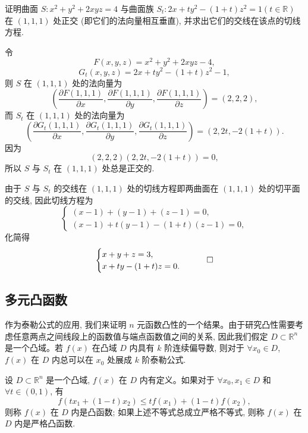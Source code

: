 \begin{example}\label{example:ma-14-6-2}
证明曲面 $S:x^2+y^2+2xyz=4$ 与曲面族 $S_t:2x+ty^2-(1+t)z^2=1(t\in\mathbb R)$ 在 $(1,1,1)$ 处正交 (即它们的法向量相互垂直), 并求出它们的交线在该点的切线方程.
\end{example}


\begin{solve}
令
\[
  F(x,y,z)=x^2+y^2+2xyz-4,
\]
\[
  G_t(x,y,z)=2x+ty^2-(1+t)z^2-1,
\]
则 $S$ 在 $(1,1,1)$ 处的法向量为
\[
  \left(
    \frac{\partial F(1,1,1)}{\partial x},
    \frac{\partial F(1,1,1)}{\partial y},
    \frac{\partial F(1,1,1)}{\partial z}
  \right)
  =(2,2,2),
\]
而 $S_t$ 在 $(1,1,1)$ 处的法向量为
\[
  \left(
    \frac{\partial G_t(1,1,1)}{\partial x},
    \frac{\partial G_t(1,1,1)}{\partial y},
    \frac{\partial G_t(1,1,1)}{\partial z}
  \right)
  =(2,2t,-2(1+t)).
\]
因为
\[
  (2,2,2)(2,2t,-2(1+t))=0,
\]
所以 $S$ 与 $S_t$ 在 $(1,1,1)$ 处总是正交的.

由于 $S$ 与 $S_t$ 的交线在 $(1,1,1)$ 处的切线方程即两曲面在 $(1,1,1)$ 处的切平面的交线, 因此切线方程为
\[
  \begin{cases}
    (x-1)+(y-1)+(z-1)=0,\\
    (x-1)+t(y-1)-(1+t)(z-1)=0,
  \end{cases}
\]
化简得
\[
  \begin{cases}
    x+y+z=3,\\
    x+ty-(1+t)z=0.
  \end{cases}
\qedhere
\]
\end{solve}


\subsection{多元凸函数}
\label{subsec:ma-14-6-3}

作为泰勒公式的应用, 我们来证明 $n$ 元函数凸性的一个结果。由于研究凸性需要考虑任意两点之间线段上的函数值与端点函数值之间的关系, 因此我们假定 $D\subset\mathbb R^n$ 是一个凸域。若 $f(x)$ 在凸域 $D$ 内具有 $k$ 阶连续偏导数, 则对于 $\forall x_0\in D$, $f(x)$ 在 $D$ 内总可以在 $x_0$ 处展成 $k$ 阶泰勒公式.

\begin{definition}\label{definition:ma-14-6-1}
设 $D\subset\mathbb R^n$ 是一个凸域, $f(x)$ 在 $D$ 内有定义。如果对于 $\forall x_0,x_1\in D$ 和 $\forall t\in(0,1)$, 有
\[
  f(tx_1+(1-t)x_2)\leqslant tf(x_1)+(1-t)f(x_2),
\]
则称 $f(x)$ 在 $D$ 内是凸函数; 如果上述不等式总成立严格不等式, 则称 $f(x)$ 在 $D$ 内是严格凸函数.
\end{definition}

